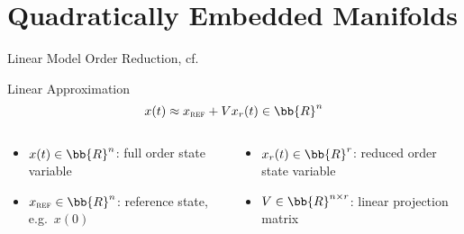 \section{Quadratically Embedded Manifolds}

\begin{frame}{Linear Model Order Reduction, cf.~\cite{Geelen2023}}
    \begin{block}{Linear Approximation}
        \begin{equation*}
            x(t) \approx x_{\textsc{ref}} + V x_r(t) \in \bb{R}^n
        \end{equation*}
    \end{block}

    \begin{columns}
        \begin{column}{.49\textwidth}
            \begin{itemize}
                \item $x(t) \in \bb{R}^n$: full order state variable
                \item $x_{\textsc{ref}} \in \bb{R}^n$: reference state, e.g.\ $x(0)$
            \end{itemize}
        \end{column}
        \begin{column}{.49\textwidth}
            \begin{itemize}
                \item $x_r(t) \in \bb{R}^r$: reduced order state variable
                \item $V \in \bb{R}^{n \times r}$: linear projection matrix
            \end{itemize}
        \end{column}
    \end{columns}



\end{frame}

